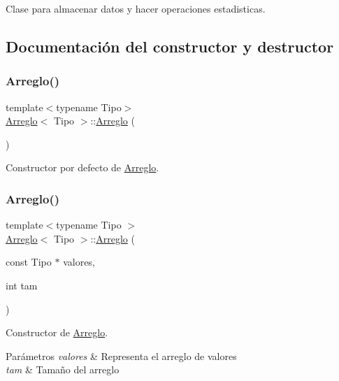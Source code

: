 Clase para almacenar datos y hacer operaciones estadisticas. 

\subsection{Documentación del constructor y destructor}
\mbox{\label{class_arreglo_a6675919f9bee34731943b4cde7d60fff}} 
\subsubsection{\texorpdfstring{Arreglo()}{Arreglo()}\hspace{0.1cm}{\footnotesize\ttfamily [1/3]}}
{\footnotesize\ttfamily template$<$typename Tipo$>$ \\
\hyperlink{class_arreglo}{Arreglo}$<$ Tipo $>$\+::\hyperlink{class_arreglo}{Arreglo} (\begin{DoxyParamCaption}{ }\end{DoxyParamCaption})\hspace{0.3cm}{\ttfamily [inline]}}



Constructor por defecto de \hyperlink{class_arreglo}{Arreglo}. 

\mbox{\label{class_arreglo_a2fbab0dd6c8a922e165711649a6a7640}} 
\subsubsection{\texorpdfstring{Arreglo()}{Arreglo()}\hspace{0.1cm}{\footnotesize\ttfamily [2/3]}}
{\footnotesize\ttfamily template$<$typename Tipo $>$ \\
\hyperlink{class_arreglo}{Arreglo}$<$ Tipo $>$\+::\hyperlink{class_arreglo}{Arreglo} (\begin{DoxyParamCaption}\item[{const Tipo $\ast$}]{valores,  }\item[{int}]{tam }\end{DoxyParamCaption})}



Constructor de \hyperlink{class_arreglo}{Arreglo}. 


\begin{DoxyParams}{Parámetros}
{\em valores} & Representa el arreglo de valores \\
\hline
{\em tam} & Tamaño del arreglo \\
\hline
\end{DoxyParams}
\mbox{\label{class_arreglo_a7917d5870c310e1ccabe456fd82b445a}} 
